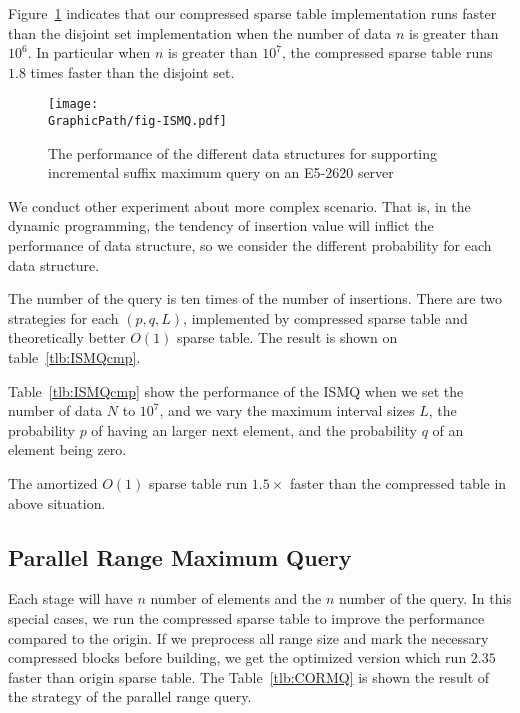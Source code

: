 Figure~\ref{fig:fig-ISMQcmp} indicates that our compressed sparse
table implementation runs faster than the disjoint set implementation
when the number of data $n$ is greater than $10^6$.  In particular
when $n$ is greater than $10^7$, the compressed sparse table runs
$1.8$ times faster than the disjoint set.

\begin{figure}[!thb]
  \centering
  \texttt{[image: \\GraphicPath/fig-ISMQ.pdf]}
  \caption{The performance of the different data structures for
    supporting incremental suffix maximum query on an E5-2620 server}
  \label{fig:fig-ISMQcmp}
\end{figure}


We conduct other experiment about more complex scenario.  That is, in
the dynamic programming, the tendency of insertion value will inflict
the performance of data structure, so we consider the different
probability for each data structure.

The number of the query is ten times of the number of insertions.  There
are two strategies for each $(p, q, L)$, implemented by compressed
sparse table and theoretically better $O(1)$ sparse table.  The result
is shown on table~\ref{tlb:ISMQcmp}.

Table~\ref{tlb:ISMQcmp} show the performance of the ISMQ when we set
the number of data $N$ to $10^7$, and we vary the maximum interval
sizes $L$, the probability $p$ of having an larger next element, and
the probability $q$ of an element being zero.

The amortized $O(1)$ sparse table run $1.5 \times$ faster than the
compressed table in above situation.



\subsection{Parallel Range Maximum Query}

Each stage will have $n$ number of elements and the $n$ number of the
query.  In this special cases, we run the compressed sparse table to
improve the performance compared to the origin.  If we preprocess all
range size and mark the necessary compressed blocks before building, we
get the optimized version which run $2.35$ faster than origin sparse
table. The Table~\ref{tlb:CORMQ} is shown the result of the strategy of
the parallel range query.


